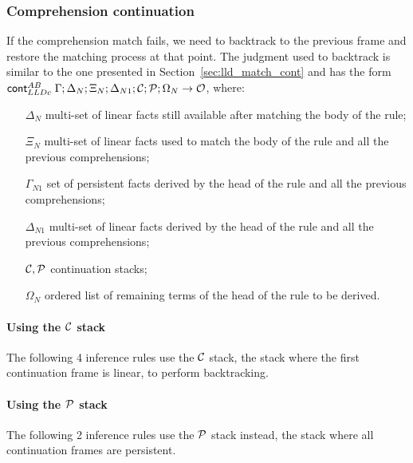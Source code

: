 

\subsubsection{Comprehension continuation}

If the comprehension match fails, we need to backtrack to the previous frame and
restore the matching process at that point. The judgment used to backtrack is
similar to the one presented in Section~\ref{sec:lld_match_cont} and has the
form $\mathsf{cont}_{LLDc}^{AB} \; \Gamma; \Delta_N; \Xi_N; \Delta_{N1}; \mathcal{C}; \mathcal{P}; \Omega_N
\rightarrow \mathcal{O}$, where:

\begin{enumerate}
   \item[$\Delta_N$] multi-set of linear facts still available after matching
   the body of the rule;
   \item[$\Xi_N$] multi-set of linear facts used to match the body of the rule
   and all the previous comprehensions;
   \item[$\Gamma_{N1}$] set of persistent facts derived by the head of the rule
   and all the previous comprehensions;
   \item[$\Delta_{N1}$] multi-set of linear facts derived by the head of the
   rule and all the previous comprehensions;
   \item[$\mathcal{C}, \mathcal{P}$] continuation stacks;
   \item[$\Omega_N$] ordered list of remaining terms of the head of the rule to
   be derived.
\end{enumerate}

\paragraph{Using the $\mathcal{C}$ stack}

The following 4 inference rules use the $\mathcal{C}$ stack, the stack where the
first continuation frame is linear, to perform backtracking.



\paragraph{Using the $\mathcal{P}$ stack}

The following 2 inference rules use the $\mathcal{P}$ stack instead, the stack where all
continuation frames are persistent.

